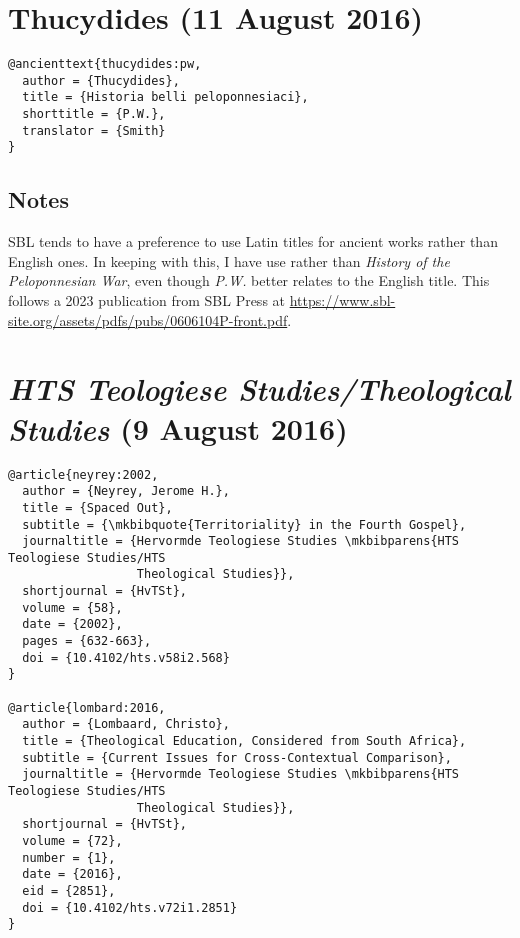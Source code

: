 \documentclass[a4paper]{article}
\begin{document}
\section{Thucydides (11 August 2016)}

\begin{verbatim}
@ancienttext{thucydides:pw,
  author = {Thucydides},
  title = {Historia belli peloponnesiaci},
  shorttitle = {P.W.},
  translator = {Smith}
}
\end{verbatim}

\exampleabbreviations

\subsection{Notes}

SBL tends to have a preference to use Latin titles for ancient works rather
than English ones. In keeping with this, I have use 
rather than \emph{History of the Peloponnesian War}, even though \emph{P.W.}
better relates to the English title. This follows a 2023 publication from SBL
Press at \url{https://www.sbl-site.org/assets/pdfs/pubs/0606104P-front.pdf}.


\section{\emph{HTS Teologiese Studies/Theological Studies} (9 August 2016)}

\begin{verbatim}
@article{neyrey:2002,
  author = {Neyrey, Jerome H.},
  title = {Spaced Out},
  subtitle = {\mkbibquote{Territoriality} in the Fourth Gospel},
  journaltitle = {Hervormde Teologiese Studies \mkbibparens{HTS Teologiese Studies/HTS
                  Theological Studies}},
  shortjournal = {HvTSt},
  volume = {58},
  date = {2002},
  pages = {632-663},
  doi = {10.4102/hts.v58i2.568}
}

@article{lombard:2016,
  author = {Lombaard, Christo},
  title = {Theological Education, Considered from South Africa},
  subtitle = {Current Issues for Cross-Contextual Comparison},
  journaltitle = {Hervormde Teologiese Studies \mkbibparens{HTS Teologiese Studies/HTS
                  Theological Studies}},
  shortjournal = {HvTSt},
  volume = {72},
  number = {1},
  date = {2016},
  eid = {2851},
  doi = {10.4102/hts.v72i1.2851}
}
\end{verbatim}
\end{document}
